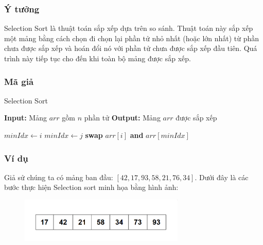 \subsubsection{Ý tưởng}
Selection Sort là thuật toán sắp xếp dựa trên so sánh. Thuật toán này sắp xếp một mảng bằng cách chọn đi chọn lại phần tử nhỏ nhất (hoặc lớn nhất) từ phần chưa được sắp xếp và hoán đổi nó với phần tử chưa được sắp xếp đầu tiên. Quá trình này tiếp tục cho đến khi toàn bộ mảng được sắp xếp. \cite{brown2021selection}
\subsubsection{Mã giả}

\begin{algorithm}[H]
    \caption{Selection Sort}
    \begin{algorithmic}[1]
        \State \textbf{Input:} Mảng $arr$ gồm $n$ phần tử
        \State \textbf{Output:} Mảng $arr$ được sắp xếp
        
            \State $minIdx \gets i$
                    \State $minIdx \gets j$
                \EndIf
            \EndFor
                \State \textbf{swap} $arr[i]$ \textbf{and} $arr[minIdx]$
            \EndIf
        \EndFor
    \EndProcedure
    \end{algorithmic}
    
\end{algorithm}
\newpage
\subsubsection{Ví dụ}
Giả sử chúng ta có mảng ban đầu: $[42, 17, 93, 58, 21, 76, 34]$. Dưới đây là các bước thực hiện Selection sort minh họa bằng hình ảnh:

\begin{figure}[H]
    \centering
    \includegraphics[width=0.7\textwidth]{img/selection sort/1.png}
    
\end{figure}

